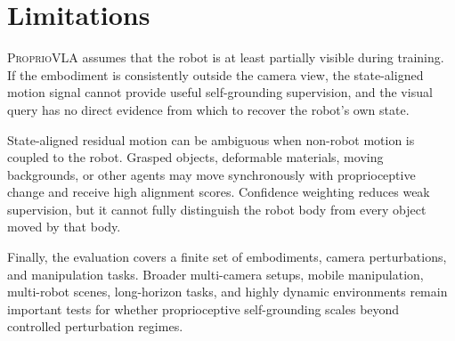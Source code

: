 \section{Limitations}

\textsc{ProprioVLA} assumes that the robot is at least partially visible during
training. If the embodiment is consistently outside the camera view, the
state-aligned motion signal cannot provide useful self-grounding supervision,
and the visual query has no direct evidence from which to recover the robot's
own state.

State-aligned residual motion can be ambiguous when non-robot motion is coupled
to the robot. Grasped objects, deformable materials, moving backgrounds, or
other agents may move synchronously with proprioceptive change and receive high
alignment scores. Confidence weighting reduces weak supervision, but it cannot
fully distinguish the robot body from every object moved by that body.

Finally, the evaluation covers a finite set of embodiments, camera
perturbations, and manipulation tasks. Broader multi-camera setups, mobile
manipulation, multi-robot scenes, long-horizon tasks, and highly dynamic
environments remain important tests for whether proprioceptive self-grounding
scales beyond controlled perturbation regimes.
